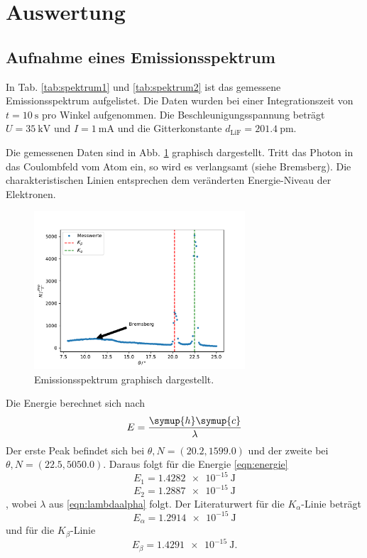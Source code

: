 \section{Auswertung}
\label{sec:Auswertung}
\subsection{Aufnahme eines Emissionsspektrum}
In Tab. \ref{tab:spektrum1} und \ref{tab:spektrum2} ist das gemessene Emissionsspektrum aufgelistet.
Die Daten wurden bei einer Integrationszeit von $t=\SI{10}{\second}$ pro Winkel aufgenommen.
Die Beschleunigungsspannung beträgt $U=\SI{35}{\kilo\volt}$ und $I=\SI{1}{\milli\ampere}$ und die Gitterkonstante $d_\text{LiF}=\SI{201.4}{\pico\metre}$.

Die gemessenen Daten sind in Abb. \ref{fig:spektrum} graphisch dargestellt.
Tritt das Photon in das Coulombfeld vom Atom ein, so wird es verlangsamt (siehe Bremsberg).
Die charakteristischen Linien entsprechen dem veränderten Energie-Niveau der Elektronen.
\begin{figure}
    \centering
    \includegraphics[width=0.7\textwidth]{content/data/plot.pdf}
    \caption{Emissionsspektrum graphisch dargestellt. \cite{numpy}}
    \label{fig:spektrum}
\end{figure}
Die Energie berechnet sich nach
\begin{equation}
    E = \frac{\symup{h}\symup{c}}{\lambda}
    \label{eqn:energie}
\end{equation}
Der erste Peak befindet sich bei $\theta, N = (20.2, 1599.0)$ und der zweite bei $\theta, N = (22.5, 5050.0)$.
Daraus folgt für die Energie \autoref{eqn:energie}
\begin{equation*}
    E_1 = \SI{1.4282e-15}{\joule}
\end{equation*}
\begin{equation*}
    E_2 = \SI{1.2887e-15}{\joule}
\end{equation*}
, wobei $\lambda$ aus \autoref{eqn:lambdaalpha} folgt.
Der Literaturwert für die $K_\alpha$-Linie \cite{klinie} beträgt
\begin{equation*}
    E_\alpha = \SI{1.2914e-15}{\joule}
\end{equation*}
und für die $K_\beta$-Linie \cite{klinie}
\begin{equation*}
     E_\beta = \SI{1.4291e-15}{\joule} .
\end{equation*}
